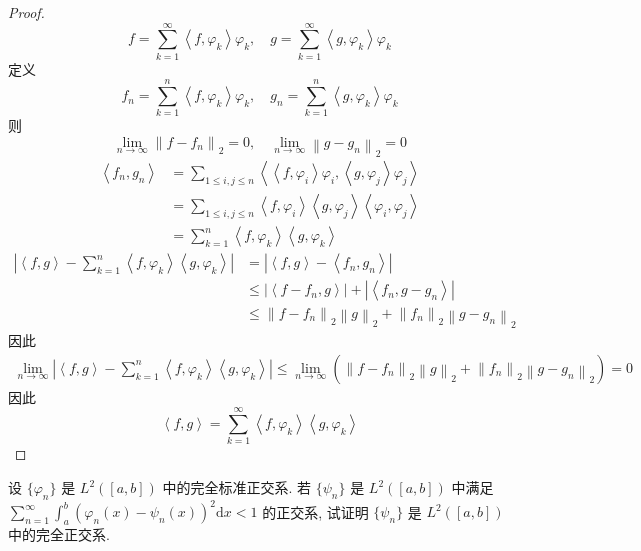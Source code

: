 \documentclass[../main.tex]{subfiles}
\begin{document}
\begin{proof}
    \[
    f= \sum _{k= 1}^{\infty}\left<f, \varphi _{k} \right> \varphi _{k},\quad g = \sum _{ k = 1}^{\infty}\left<g, \varphi _{k} \right> \varphi _{k}
    \]定义 \[
    f_{n}= \sum _{k= 1}^{n}\left<f, \varphi _{k} \right> \varphi _{k},\quad g_{n}= \sum _{k = 1}^{n}\left<g, \varphi _{k} \right> \varphi _{k}
    \]则 \[
    \lim_{n\to \infty}\left\| f-f_{n} \right\|_{2}= 0,\quad \lim_{n\to \infty }\left\| g-g_{n} \right\|_{2}= 0
    \] \[
    \begin{aligned}
    \left<f_{n},g_{n} \right>&= \sum _{1\le i,j\le n}\left<\left<f, \varphi _{i} \right> \varphi _{i},\left<g, \varphi _{j} \right> \varphi _{j} \right> \\ 
     &= \sum _{1\le i,j\le n}\left<f, \varphi _{i} \right>\left<g, \varphi _{j} \right>\left< \varphi _{i}, \varphi _{j} \right>\\ 
      &= \sum _{k= 1}^{n}\left<f, \varphi _{k} \right>\left<g, \varphi _{k} \right>
    \end{aligned}
    \] \[
    \begin{aligned}
    \left| \left<f,g \right>-\sum _{k = 1}^{n}\left<f, \varphi _{k} \right>\left<g, \varphi _{k} \right> \right| &= \left| \left<f,g \right>-\left<f_{n},g_{n} \right> \right|  \\ 
     &\le \left| \left<f-f_{n},g \right> \right|+ \left| \left<f_{n},g-g_{n} \right> \right|  \\ 
      &\le \left\| f-f_{n} \right\|_{2}\left\| g \right\|_{2}+ \left\| f_{n} \right\|_{2}\left\| g-g_{n} \right\|_{2}
    \end{aligned}
    \]因此 \[
    \begin{aligned}
    \lim_{n\to \infty}\left| \left<f,g \right>-\sum _{k= 1}^{n}\left<f, \varphi _{k} \right>\left<g, \varphi _{k} \right> \right|\le \lim_{n\to \infty}  \left( \left\| f-f_{n} \right\|_{2}\left\| g \right\|_{2}+ \left\| f_{n} \right\|_{2}\left\| g-g_{n} \right\|_{2} \right)= 0 
    \end{aligned}
    \]因此 \[
    \left<f,g \right>= \sum _{k= 1}^{\infty}\left<f, \varphi _{k} \right>\left<g, \varphi _{k} \right>
    \]
\end{proof}

\begin{exercise}{}{}
设 $\{\varphi_n\}$ 是 $L^2([a, b])$ 中的完全标准正交系. 若 $\{\psi_n\}$ 是 $L^2([a, b])$ 中满足 $\sum_{n=1}^\infty \int_a^b (\varphi_n(x) - \psi_n(x))^2 \mathrm{d}x < 1$ 的正交系, 试证明 $\{\psi_n\}$ 是 $L^2([a, b])$ 中的完全正交系.
\end{exercise}
\end{document}
